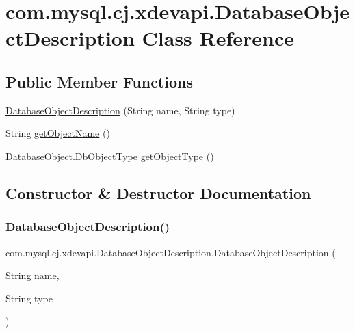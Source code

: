 \hypertarget{classcom_1_1mysql_1_1cj_1_1xdevapi_1_1_database_object_description}{}\section{com.\+mysql.\+cj.\+xdevapi.\+Database\+Object\+Description Class Reference}
\label{classcom_1_1mysql_1_1cj_1_1xdevapi_1_1_database_object_description}
\subsection*{Public Member Functions}
\begin{DoxyCompactItemize}
\item 
\mbox{\hyperlink{classcom_1_1mysql_1_1cj_1_1xdevapi_1_1_database_object_description_aad08f685933782dfbd8613e9a75af6d6}{Database\+Object\+Description}} (String name, String type)
\item 
String \mbox{\hyperlink{classcom_1_1mysql_1_1cj_1_1xdevapi_1_1_database_object_description_ac076f33b429ce8d5e89b967e8d607055}{get\+Object\+Name}} ()
\item 
Database\+Object.\+Db\+Object\+Type \mbox{\hyperlink{classcom_1_1mysql_1_1cj_1_1xdevapi_1_1_database_object_description_a929c30e6770deecf2d87b6a1464c521e}{get\+Object\+Type}} ()
\end{DoxyCompactItemize}


\subsection{Constructor \& Destructor Documentation}
\mbox{\label{classcom_1_1mysql_1_1cj_1_1xdevapi_1_1_database_object_description_aad08f685933782dfbd8613e9a75af6d6}} 
\subsubsection{\texorpdfstring{Database\+Object\+Description()}{DatabaseObjectDescription()}}
{\footnotesize\ttfamily com.\+mysql.\+cj.\+xdevapi.\+Database\+Object\+Description.\+Database\+Object\+Description (\begin{DoxyParamCaption}\item[{String}]{name,  }\item[{String}]{type }\end{DoxyParamCaption})}



